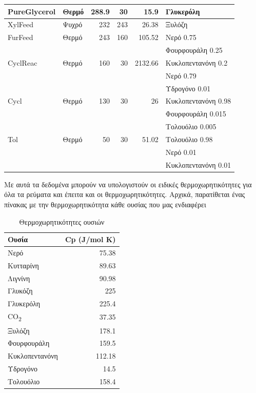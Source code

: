 \documentclass[11pt]{article}
\begin{document}
\begin{longtable}{llrrrl}
\hline
PureGlycerol & Θερμό & 288.9 & 30 & 15.9 & Γλυκερόλη\\
\hline
XylFeed & Ψυχρό & 232 & 243 & 26.38 & Ξυλόζη\\
\hline
FurFeed & Θερμό & 243 & 160 & 105.52 & Νερό 0.75\\
 &  &  &  &  & Φουρφουράλη 0.25\\
\hline
CyclReac & Θερμό & 160 & 30 & 2132.66 & Κυκλοπεντανόνη 0.2\\
 &  &  &  &  & Νερό 0.79\\
 &  &  &  &  & Υδρογόνο 0.01\\
\hline
Cycl & Θερμό & 130 & 30 & 26 & Κυκλοπεντανόνη 0.98\\
 &  &  &  &  & Φουρφουράλη 0.015\\
 &  &  &  &  & Τολουόλιο 0.005\\
\hline
Tol & Θερμό & 50 & 30 & 51.02 & Τολουόλιο 0.98\\
 &  &  &  &  & Νερό 0.01\\
 &  &  &  &  & Κυκλοπεντανόνη 0.01\\
\hline
\end{longtable}

Με αυτά τα δεδομένα μπορούν να υπολογιστούν οι ειδικές θερμοχωρητικότητες για όλα τα ρεύματα και έπειτα και οι θερμοχωρητικότητες. Αρχικά, παρατίθεται ένας πίνακας με την θερμοχωρητικότητα κάθε ουσίας που μας ενδιαφέρει
\begin{table}[htbp]
\caption{Θερμοχωρητικότητες ουσιών}
\centering
\begin{tabular}{lr}
Ουσία & Cp (J/mol K)\\
\hline
Νερό & 75.38\\
Κυτταρίνη & 89.63\\
Λιγνίνη & 90.98\\
Γλυκόζη & 225\\
Γλυκερόλη & 225.4\\
CO\textsubscript{2} & 37.35\\
Ξυλόζη & 178.1\\
Φουρφουράλη & 159.5\\
Κυκλοπεντανόνη & 112.18\\
Υδρογόνο & 14.5\\
Τολουόλιο & 158.4\\
\hline
\end{tabular}
\end{table}
\end{document}

